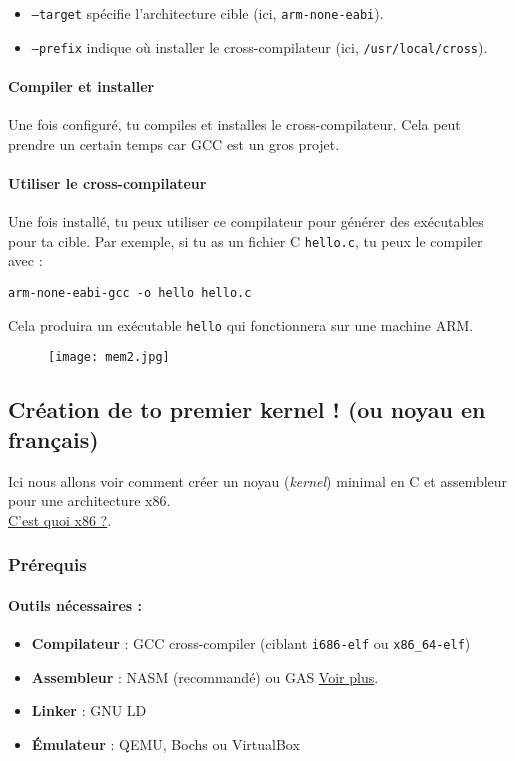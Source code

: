 \documentclass{article}
\begin{document}
\begin{itemize}
    \item \texttt{--target} spécifie l'architecture cible (ici, \texttt{arm-none-eabi}).
    \item \texttt{--prefix} indique où installer le cross-compilateur (ici, \texttt{/usr/local/cross}).
\end{itemize}

\paragraph{Compiler et installer}
Une fois configuré, tu compiles et installes le cross-compilateur. Cela peut prendre un certain temps car GCC est un gros projet.

\paragraph{Utiliser le cross-compilateur}
Une fois installé, tu peux utiliser ce compilateur pour générer des exécutables pour ta cible. Par exemple, si tu as un fichier C \texttt{hello.c}, tu peux le compiler avec :

\begin{lstlisting}
arm-none-eabi-gcc -o hello hello.c
\end{lstlisting}

Cela produira un exécutable \texttt{hello} qui fonctionnera sur une machine ARM.

\begin{figure}[h!]
    \centering
    \texttt{[image: mem2.jpg]}
    \label{fig:logo2}
\end{figure}



\subsection*{Création de to premier kernel ! (ou noyau en français)}
Ici nous allons voir comment créer un noyau (\textit{kernel}) minimal en C et assembleur pour une architecture x86. \\ \hyperref[fig:x86]{C'est quoi x86 ?}.
\subsubsection*{Prérequis}
\paragraph{Outils nécessaires :}
\begin{itemize}
    \item \textbf{Compilateur} : GCC cross-compiler (ciblant \texttt{i686-elf} ou \texttt{x86\_64-elf})
    \item \textbf{Assembleur} : NASM  (recommandé) ou GAS   \hyperref[fig:nasm]{Voir plus}.

    \item \textbf{Linker} : GNU LD
    \item \textbf{Émulateur} : QEMU, Bochs ou VirtualBox
\end{itemize}
\end{document}
